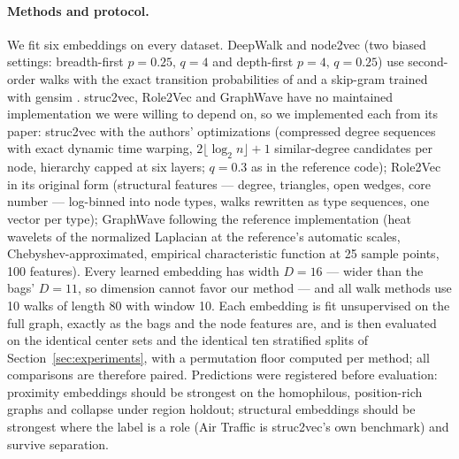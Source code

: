 \paragraph{Methods and protocol.}
We fit six embeddings on every dataset. DeepWalk and node2vec (two
biased settings: breadth-first $p{=}0.25,\,q{=}4$ and depth-first
$p{=}4,\,q{=}0.25$) use second-order walks with the exact transition
probabilities of \citet{grover2016node2vec} and a skip-gram
\citep{mikolov2013word2vec} trained with gensim \citep{rehurek2010gensim}.
struc2vec, Role2Vec and GraphWave have no maintained implementation we
were willing to depend on, so we implemented each from its paper:
struc2vec with the authors' optimizations (compressed degree sequences
with exact dynamic time warping, $2\lfloor\log_2 n\rfloor{+}1$
similar-degree candidates per node, hierarchy capped at six layers;
$q{=}0.3$ as in the reference code); Role2Vec in its original form
(structural features --- degree, triangles, open wedges, core number ---
log-binned into node types, walks rewritten as type sequences, one vector
per type); GraphWave following the reference implementation (heat
wavelets of the normalized Laplacian at the reference's automatic scales,
Chebyshev-approximated, empirical characteristic function at 25 sample
points, 100 features). Every learned embedding has width $D{=}16$ ---
wider than the bags' $D{=}11$, so dimension cannot favor our method ---
and all walk methods use 10 walks of length 80 with window 10. Each
embedding is fit unsupervised on the full graph, exactly as the bags and
the node features are, and is then evaluated on the identical center sets
and the identical ten stratified splits of
Section~\ref{sec:experiments}, with a permutation floor computed per
method; all comparisons are therefore paired. Predictions were registered
before evaluation: proximity embeddings should be strongest on the
homophilous, position-rich graphs and collapse under region holdout;
structural embeddings should be strongest where the label is a role
(Air Traffic is struc2vec's own benchmark) and survive separation.

